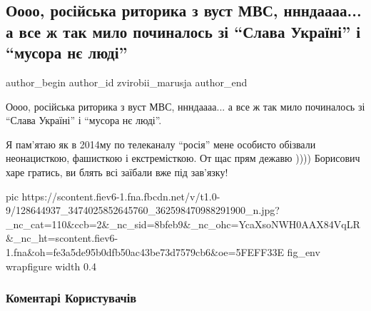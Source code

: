  
 
 
 
 
 
\subsection{Оооо, російська риторика з вуст МВС, ннндаааа... а все ж так мило починалось зі \enquote{Слава Україні} і \enquote{мусора нє люді}}
\label{sec:02_12_2020.fb.zvirobii_marusja.1.musore_ne_ljudi}
\ifcmt
	author_begin
   author_id zvirobii_marusja
	author_end
\fi

Оооо, російська риторика з вуст МВС, ннндаааа... а все ж так мило починалось зі \enquote{Слава Україні} і \enquote{мусора нє люді}. 

Я пам'ятаю як в 2014му по телеканалу \enquote{росія} мене особисто обізвали
неонацисткою, фашисткою і екстремісткою. От щас прям дежавю )))) Борисович харе
гратись, ви блять всі заїбали вже під зав'язку!

\ifcmt
pic https://scontent.fiev6-1.fna.fbcdn.net/v/t1.0-9/128644937_3474025852645760_362598470988291900_n.jpg?_nc_cat=110&ccb=2&_nc_sid=8bfeb9&_nc_ohc=YcaXsoNWH0AAX84VqLR&_nc_ht=scontent.fiev6-1.fna&oh=fe3a5de95b0dfb50ac43be73d7579cb6&oe=5FEFF33E
fig_env wrapfigure
width 0.4
\fi

\subsubsection{Коментарі Користувачів}

